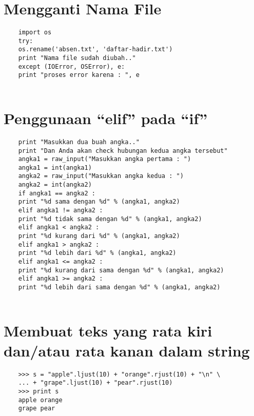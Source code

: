 \documentclass[12pt]{article} %
\begin{document}
\section {Mengganti Nama File}
\begin{lstlisting}
	import os
	try:
	os.rename('absen.txt', 'daftar-hadir.txt')
	print "Nama file sudah diubah.."
	except (IOError, OSError), e:
	print "proses error karena : ", e
	
\end{lstlisting}

\section {Penggunaan “elif” pada “if”}
\begin{lstlisting}
	print "Masukkan dua buah angka.."
	print "Dan Anda akan check hubungan kedua angka tersebut"
	angka1 = raw_input("Masukkan angka pertama : ")
	angka1 = int(angka1)
	angka2 = raw_input("Masukkan angka kedua : ")
	angka2 = int(angka2)
	if angka1 == angka2 :
	print "%d sama dengan %d" % (angka1, angka2)
	elif angka1 != angka2 :
	print "%d tidak sama dengan %d" % (angka1, angka2)
	elif angka1 < angka2 :
	print "%d kurang dari %d" % (angka1, angka2)
	elif angka1 > angka2 :
	print "%d lebih dari %d" % (angka1, angka2)
	elif angka1 <= angka2 :
	print "%d kurang dari sama dengan %d" % (angka1, angka2)
	elif angka1 >= angka2 :
	print "%d lebih dari sama dengan %d" % (angka1, angka2)
	
\end{lstlisting}

\section {Membuat teks yang rata kiri dan/atau rata kanan dalam string}
\begin{lstlisting}
	>>> s = "apple".ljust(10) + "orange".rjust(10) + "\n" \
	... + "grape".ljust(10) + "pear".rjust(10)
	>>> print s
	apple orange
	grape pear
\end{lstlisting}
\end{document}
